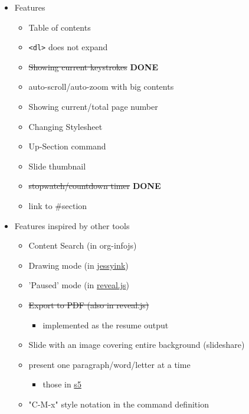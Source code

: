 \begin{container-fluid}
\begin{row-fluid}
\begin{span6}
\begin{smaller}
\begin{itemize}
\item Features
\begin{itemize}
\item Table of contents
\item \texttt{<dl>} does not expand
\item \sout{Showing current keystrokes} \textbf{DONE}
\item auto-scroll/auto-zoom with big contents
\item Showing current/total page number
\item Changing Stylesheet
\item Up-Section command
\item Slide thumbnail
\item \sout{stopwatch/countdown timer} \textbf{DONE}
\item link to \#section
\end{itemize}
\end{itemize}
\end{smaller}
\end{span6}
\begin{span6}
\begin{smaller}
\begin{itemize}
\item Features inspired by other tools
\begin{itemize}
\item Content Search (in org-infojs)
\item Drawing mode (in \href{http://code.google.com/p/jessyink/}{jessyink})
\item 'Paused' mode (in \href{http://lab.hakim.se/reveal-js/}{reveal.js})
\item \sout{Export to PDF (also in reveal.js)}
\begin{itemize}
\item implemented as the resume output
\end{itemize}
\item Slide with an image covering entire background (slideshare)
\item present one paragraph/word/letter at a time
\begin{itemize}
\item those in \href{http://docutils.sourceforge.net/docs/user/slide-shows.s5.html}{s5}
\end{itemize}
\item "C-M-x" style notation in the command definition
\end{itemize}
\end{itemize}
\end{smaller}
\end{span6}
\end{row-fluid}
\end{container-fluid}
